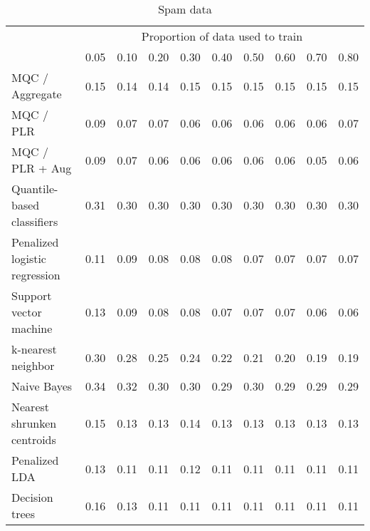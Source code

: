 
\begin{table}
  \centering
  \begin{tabular}{lrrrrrrrrr}
    \toprule
    & \multicolumn{9}{c}{Proportion of data used to train} \\
    \cline{2-10}
    & 0.05 & 0.10 & 0.20 & 0.30 & 0.40 & 0.50 & 0.60 & 0.70 & 0.80 \\
    \midrule
    MQC / Aggregate & 0.15 & 0.14 & 0.14 & 0.15 & 0.15 & 0.15 & 0.15 & 0.15 & 0.15 \\ 
    MQC / PLR & 0.09 & 0.07 & 0.07 & 0.06 & 0.06 & 0.06 & 0.06 & 0.06 & 0.07 \\ 
    MQC / PLR + Aug & 0.09 & 0.07 & 0.06 & 0.06 & 0.06 & 0.06 & 0.06 & 0.05 & 0.06 \\ 
    Quantile-based classifiers & 0.31 & 0.30 & 0.30 & 0.30 & 0.30 & 0.30 & 0.30 & 0.30 & 0.30 \\ 
    Penalized logistic regression & 0.11 & 0.09 & 0.08 & 0.08 & 0.08 & 0.07 & 0.07 & 0.07 & 0.07 \\ 
    Support vector machine & 0.13 & 0.09 & 0.08 & 0.08 & 0.07 & 0.07 & 0.07 & 0.06 & 0.06 \\ 
    k-nearest neighbor & 0.30 & 0.28 & 0.25 & 0.24 & 0.22 & 0.21 & 0.20 & 0.19 & 0.19 \\ 
    Naive Bayes & 0.34 & 0.32 & 0.30 & 0.30 & 0.29 & 0.30 & 0.29 & 0.29 & 0.29 \\ 
    Nearest shrunken centroids & 0.15 & 0.13 & 0.13 & 0.14 & 0.13 & 0.13 & 0.13 & 0.13 & 0.13 \\ 
    Penalized LDA & 0.13 & 0.11 & 0.11 & 0.12 & 0.11 & 0.11 & 0.11 & 0.11 & 0.11 \\ 
    Decision trees & 0.16 & 0.13 & 0.11 & 0.11 & 0.11 & 0.11 & 0.11 & 0.11 & 0.11 \\ 
    \bottomrule
  \end{tabular}

  \caption{Spam data}
  \label{tab:spam}
\end{table}





